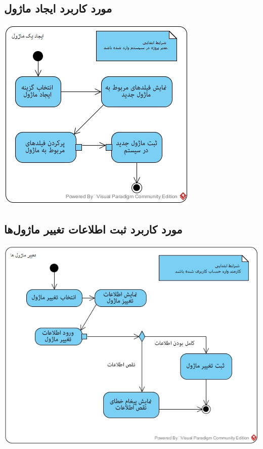 \subsection*{مورد کاربرد ایجاد ماژول}
\vspace{2cm}
\begin{center}
\includegraphics[width=\textwidth]{ActivityDiagrams/27.jpg}
\end{center}


\newpage
\vspace{2cm}
\subsection*{مورد کاربرد ثبت اطلاعات تغییر ماژول‌ها}
\vspace{2cm}
\begin{center}
\includegraphics[width=\textwidth]{ActivityDiagrams/28.jpg}
\end{center}

